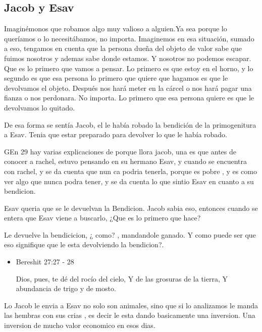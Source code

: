 \documentclass[conference]{IEEEtran}
\begin{document}
\subsection{Jacob y Esav}











Imaginémonos que robamos algo muy valioso a alguien.Ya sea porque lo queríamos o lo necesitábamos, no importa.
Imaginemos en esa situación, sumado a eso, tengamos en cuenta que la persona dueña del objeto de valor sabe que fuimos nosotros y ademas sabe donde estamos. Y nosotros no podemos escapar. Que es lo primero que vamos a pensar.
Lo primero es que estoy en el horno, y lo segundo es que esa persona lo primero que quiere que hagamos es que le devolvamos el objeto. Después nos hará meter en la cárcel o nos hará pagar una fianza o nos perdonara. No importa. Lo primero que esa persona quiere es que le devolvamos lo quitado.

De esa forma se sentía Jacob, el le había robado la bendición de la primogenitura a Esav. Tenia que estar preparado para devolver lo que le había robado. 




GEn 29
hay varias explicaciones de porque llora jacob, una es que antes de conocer a rachel, estuvo pensando en su hermano Esav, y cuando se encuentra con rachel, y se da cuenta que nun ca podria tenerla, porque es pobre , y es como ver algo que nunca podra tener, y se da cuenta lo que sintio Esav en cuanto a su bendicion. 






Esav  queria que se le devuelvan la Bendicion. Jacob sabia eso, entonces cuando se entera que Esav viene a buscarlo, ¿Que es lo primero que hace? 

Le devuelve la bendicicion, ¿ como? , mandandole ganado. Y como puede ser que eso signifique que le esta devolviendo la bendicion?.
\begin{itemize}
\item Bereshit 27:27 - 28
 
Dios, pues, te dé del rocío del cielo,
Y de las grosuras de la tierra,
Y abundancia de trigo y de mosto.
\end{itemize}

Lo Jacob le envia a Esav no solo son animales, sino que si lo analizamos le manda las hembras con sus crias , es decir le esta dando basicamente una inversion. Una inversion de mucho valor economico en esos dias.
\end{document}
